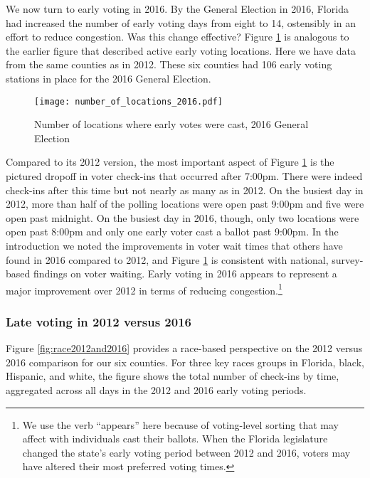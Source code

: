 \documentclass[12pt,titlepage]{article}
\begin{document}
We now turn to early voting in 2016.  By the General Election in 2016,
Florida had increased the number of early voting days from eight to
14, ostensibly in an effort to reduce congestion. Was this change
effective?  Figure \ref{fig:nrlocs2016} is analogous to the earlier
figure that described active early voting locations.  Here we have
data from the same counties as in 2012.  These six counties had 106
early voting stations in place for the 2016 General Election.


\begin{figure}[!ht]
  \caption{Number of locations where early votes were cast, 2016 General
    Election}
  \label{fig:nrlocs2016}
  \centering
    \centering\texttt{[image: number\_of\_locations\_2016.pdf]}
\end{figure}

Compared to its 2012 version, the most important aspect of Figure
\ref{fig:nrlocs2016} is the pictured dropoff in voter check-ins that
occurred after 7:00pm.  There were indeed check-ins after this time
but not nearly as many as in 2012.  On the busiest day in 2012, more
than half of the polling locations were open past 9:00pm and five were
open past midnight.  On the busiest day in 2016, though, only two
locations were open past 8:00pm and only one early voter cast a ballot
past 9:00pm.  In the introduction we noted the improvements in voter
wait times that others have found in 2016 compared to 2012, and Figure
\ref{fig:nrlocs2016} is consistent with national, survey-based
findings on voter waiting.  Early voting in 2016 appears to represent
a major improvement over 2012 in terms of reducing
congestion.\footnote{We use the verb ``appears'' here because of
  voting-level sorting that may affect with individuals cast their
  ballots.  When the Florida legislature changed the state's early
  voting period between 2012 and 2016, voters may have altered their
  most preferred voting times.}

\subsubsection*{Late voting in 2012 versus 2016}

Figure \ref{fig:race2012and2016} provides a race-based perspective on
the 2012 versus 2016 comparison for our six counties.  For three key
races groups in Florida, black, Hispanic, and white, the figure shows
the total number of check-ins by time, aggregated across all days in
the 2012 and 2016 early voting periods.
\end{document}
